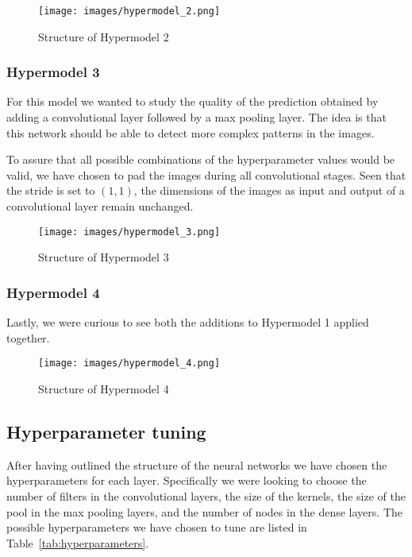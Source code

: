 \begin{figure}[h]
    \label{fig:Hypermodel_2}
    \centering
    \texttt{[image: images/hypermodel\_2.png]}
    \caption{Structure of Hypermodel 2}
\end{figure}

\subsubsection{Hypermodel 3}\label{hypermodel_3}
For this model we wanted to study the quality of the prediction obtained by adding a convolutional layer followed by a max pooling layer. The idea is that this network should be able to detect more complex patterns in the images.

To assure that all possible combinations of the hyperparameter values would be valid, we have chosen to pad the images during all convolutional stages. Seen that the stride is set to $(1,1)$, the dimensions of the images as input and output of a convolutional layer remain unchanged.

\begin{figure}[!]
    \label{fig:Hypermodel_3}
    \centering
    \texttt{[image: images/hypermodel\_3.png]}
    \caption{Structure of Hypermodel 3}
\end{figure}

\subsubsection{Hypermodel 4}\label{hypermodel_4}
Lastly, we were curious to see both the additions to Hypermodel 1 applied together.

\begin{figure}[!]
    \label{fig:Hypermodel_4}
    \centering
    \texttt{[image: images/hypermodel\_4.png]}
    \caption{Structure of Hypermodel 4}
\end{figure}

\subsection{Hyperparameter tuning}\label{hyperparameter_tuning}
After having outlined the structure of the neural networks we have chosen the hyperparameters for each layer. Specifically we were looking to choose the number of filters in the convolutional layers, the size of the kernels, the size of the pool in the max pooling layers, and the number of nodes in the dense layers. The possible hyperparameters we have chosen to tune are listed in Table~\ref{tab:hyperparameters}.

